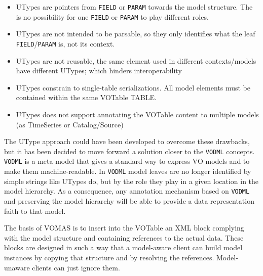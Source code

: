 \begin{itemize}
  \item UTypes are pointers from \texttt{FIELD} or \texttt{PARAM} towards the 
  model structure. The is no possibility for one  \texttt{FIELD} or
  \texttt{PARAM} to play different roles.
  \item UTypes are not intended to be parsable, so they only identifies what the leaf 
  \texttt{FIELD}/\texttt{PARAM} is, not its context.
  \item UTypes are not reusable, the same element used in different contexts/models 
  have different UTypes; which hinders interoperability
  \item UTypes constrain to single-table serializations. All model elements must 
  be contained within the same VOTable TABLE.
  \item UTypes does not support annotating the VOTable content to multiple models 
  (as TimeSeries or Catalog/Source)
\end{itemize}

The UType approach could have been developed to overcome these drawbacks, but it has been decided to move forward a solution closer to the \texttt{VODML} \citep{2018ivoa.spec.0910L} concepts. 
 \texttt{VODML} is a meta-model that gives a standard way to express VO models and to make them machine-readable.
In \texttt{VODML}  model leaves are no longer identified by simple strings like UTypes do, but by the role they play in a given location in the model hierarchy.
As a consequence, any annotation mechanism based on \texttt{VODML} and preserving the model hierarchy will be able  to provide a data representation faith to that model.

The basis of VOMAS is to insert into the VOTable an XML block complying with the 
model structure and containing references to the actual data.
These blocks are designed in such a way that a model-aware client can build  model instances by copying that structure and by resolving the references. Model-unaware clients can just ignore them. 





